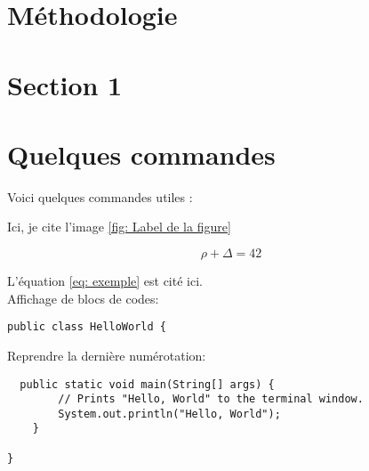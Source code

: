\documentclass{rapportUHA40}
\begin{document}
\newpage

\section{Méthodologie}
\lipsum[2-3]





\newpage

\section{Section 1}




\section{Quelques commandes}

Voici quelques commandes utiles :



Ici, je cite l'image \ref{fig: Label de la figure}



\begin{equation} \label{eq: exemple}
\rho + \Delta = 42
\end{equation}

L'équation \ref{eq: exemple} est cité ici. \\

Affichage de blocs de codes:
\begin{verbatim}
public class HelloWorld {
\end{verbatim}

Reprendre la dernière numérotation:
\begin{verbatim}
  public static void main(String[] args) {
        // Prints "Hello, World" to the terminal window.
        System.out.println("Hello, World");
    }

}
\end{verbatim}
\end{document}
